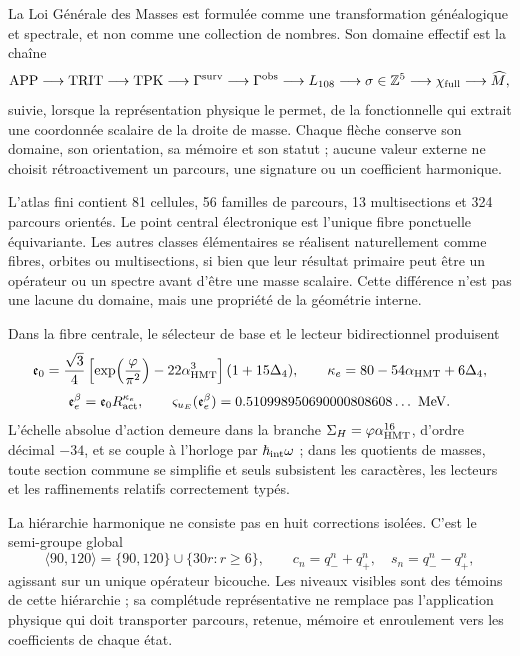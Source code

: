 La Loi Générale des Masses est formulée comme une transformation généalogique et
spectrale, et non comme une collection de nombres. Son domaine effectif est la chaîne
\[
\text{APP}\longrightarrow\text{TRIT}\longrightarrow\text{TPK}
\longrightarrow\Gamma^{\rm surv}\longrightarrow\Gamma^{\rm obs}
\longrightarrow L_{108}\longrightarrow\sigma\in\mathbb Z^5
\longrightarrow\chi_{\rm full}\longrightarrow\widehat M,
\]
suivie, lorsque la représentation physique le permet, de la fonctionnelle qui
extrait une coordonnée scalaire de la droite de masse. Chaque flèche conserve son
domaine, son orientation, sa mémoire et son statut ; aucune valeur externe ne choisit
rétroactivement un parcours, une signature ou un coefficient harmonique.

L'atlas fini contient 81 cellules, 56 familles de parcours, 13 multisections et
324 parcours orientés. Le point central électronique est l'unique fibre ponctuelle
équivariante. Les autres classes élémentaires se réalisent naturellement comme
fibres, orbites ou multisections, si bien que leur résultat primaire peut être un
opérateur ou un spectre avant d'être une masse scalaire. Cette différence n'est pas une
lacune du domaine, mais une propriété de la géométrie interne.

Dans la fibre centrale, le sélecteur de base et le lecteur bidirectionnel produisent
\[
\mathfrak e_0
=\frac{\sqrt3}{4}
 \left[\exp\!\left(\frac{\varphi}{\pi^2}\right)
       -22\alpha_{\rm HMT}^3\right](1+15\Delta_4),
\qquad
\kappa_e=80-54\alpha_{\rm HMT}+6\Delta_4,
\]
\[
\mathfrak e_e^\beta=\mathfrak e_0R_{\rm act}^{\kappa_e},
\qquad
\varsigma_{u_E}(\mathfrak e_e^\beta)
=0.510998950690000808608\ldots\ \mathrm{MeV}.
\]
L'échelle absolue d'action demeure dans la branche
\(\Sigma_H=\varphi\alpha_{\rm HMT}^{16}\), d'ordre décimal \(-34\), et se
couple à l'horloge par \(\hbar_{\rm int}\omega\) ; dans les quotients de
masses, toute section commune se simplifie et seuls subsistent les caractères, les
lecteurs et les raffinements relatifs correctement typés.

La hiérarchie harmonique ne consiste pas en huit corrections isolées. C'est le semi-groupe
global
\[
\langle90,120\rangle
=\{90,120\}\cup\{30r:r\ge6\},
\qquad
c_n=q_-^n+q_+^n,
\quad s_n=q_-^n-q_+^n,
\]
agissant sur un unique opérateur bicouche. Les niveaux visibles sont des témoins de
cette hiérarchie ; sa complétude représentative ne remplace pas l'application physique qui
doit transporter parcours, retenue, mémoire et enroulement vers les coefficients de chaque
état.

